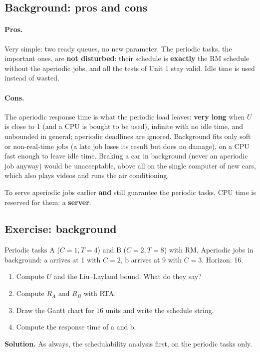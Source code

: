 \subsection{Background: pros and cons}
\paragraph{Pros.} Very simple: two ready queues, no new parameter. The periodic tasks, the important ones, are \textbf{not disturbed}: their schedule is \textbf{exactly} the RM schedule without the aperiodic jobs, and all the tests of Unit 1 stay valid. Idle time is used instead of wasted.

\paragraph{Cons.} The aperiodic response time is what the periodic load leaves: \textbf{very long} when $U$ is close to 1 (and a CPU is bought to be used), infinite with no idle time, and unbounded in general; aperiodic deadlines are ignored. Background fits only soft or non-real-time jobs (a late job loses its result but does no damage), on a CPU fast enough to leave idle time. Braking a car in background (never an aperiodic job anyway) would be unacceptable, above all on the single computer of new cars, which also plays videos and runs the air conditioning.

To serve aperiodic jobs earlier \textbf{and} still guarantee the periodic tasks, CPU time is reserved for them: a \textbf{server}.

\subsection{Exercise: background}
Periodic tasks A ($C = 1, T = 4$) and B ($C = 2, T = 8$) with RM. Aperiodic jobs in background: a arrives at 1 with $C = 2$, b arrives at 9 with $C = 3$. Horizon: 16.
\begin{enumerate}
    \item Compute $U$ and the Liu--Layland bound. What do they say?
    \item Compute $R_A$ and $R_B$ with RTA.
    \item Draw the Gantt chart for 16 units and write the schedule string.
    \item Compute the response time of a and b.
\end{enumerate}

\textbf{Solution.} As always, the schedulability analysis first, on the periodic tasks only.

